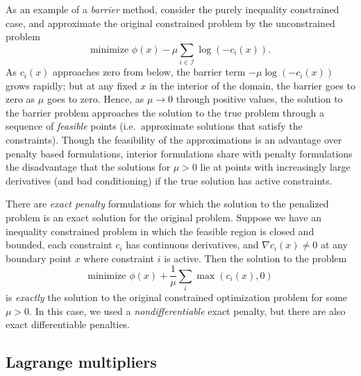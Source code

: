 \documentclass[12pt, leqno]{article} %
\begin{document}
As an example of a {\em barrier} method, consider the purely inequality
constrained case, and approximate the original constrained problem
by the unconstrained problem
\[
  \mbox{minimize } \phi(x) - \mu \sum_{i \in \mathcal{I}} \log(-c_i(x)).
\]
As $c_i(x)$ approaches zero from below, the barrier term
$-\mu \log (-c_i(x))$ grows rapidly; but at any fixed $x$ in the
interior of the domain, the barrier goes to zero as $\mu$ goes to
zero.  Hence, as $\mu \rightarrow 0$ through positive values, the
solution to the barrier problem approaches the solution to the true
problem through a sequence of {\em feasible} points (i.e.~approximate
solutions that satisfy the constraints).  Though the feasibility of
the approximations is an advantage over penalty based formulations,
interior formulations share with penalty formulations the disadvantage
that the solutions for $\mu > 0$ lie at points with increasingly large
derivatives (and bad conditioning) if the true solution has active
constraints.

There are {\em exact penalty} formulations for which the solution to
the penalized problem is an exact solution for the original problem.
Suppose we have an inequality constrained problem in which the
feasible region is closed and bounded, each constraint $c_i$ has
continuous derivatives, and $\nabla c_i(x) \neq 0$ at any boundary
point $x$ where constraint $i$ is active.  Then the solution to the
problem
\[
  \mbox{minimize } \phi(x) + \frac{1}{\mu} \sum_i \max(c_i(x), 0)
\]
is {\em exactly} the solution to the original constrained optimization
problem for some $\mu > 0$.  In this case, we used a {\em nondifferentiable}
exact penalty, but there are also exact differentiable penalties.

\subsection*{Lagrange multipliers}

\end{document}
